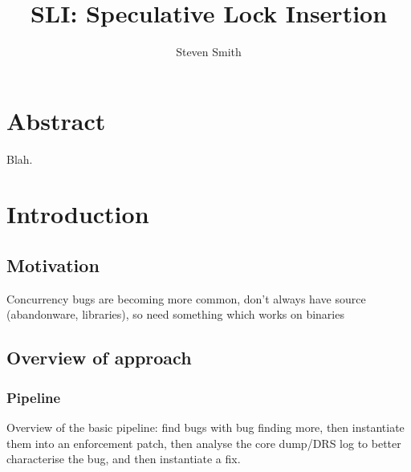 \documentclass[12pt,a4paper]{book}
\author{Steven Smith}
\title{SLI: Speculative Lock Insertion}
\begin{document}
\newcommand{\editorial}[1]{\textcolor{red}{\footnote{\textcolor{red}{#1}}}}
\newcommand{\needCite}{\editorial{need cite}}
\newcommand{\todo}[1]{\textcolor{red}{#1}}
\newcommand{\StateMachine}{finite state automaton}
\newcommand{\StateMachines}{finite state automata}
\newcommand{\CrashSummary}{crash summary}
\newcommand{\CrashSummaries}{crash summaries}
\newcommand{\concatDynTraces}{\oplus}
\newcommand{\queue}[1]{\{#1\}}
\newcommand{\map}[1]{\{#1\}}
\newcommand{\mapIndex}[2]{#1[#2]}
\newcommand{\state}[1]{#1}

\maketitle

\chapter{Abstract}
Blah.

\chapter{Introduction}
\section{Motivation}
Concurrency bugs are becoming more common, don't always have source (abandonware, libraries), so need something which works on binaries

\section{Overview of approach}
\subsection{Pipeline}
Overview of the basic pipeline: find bugs with bug finding more, then instantiate them into an enforcement patch, then analyse the core dump/DRS log to better characterise the bug, and then instantiate a fix.
\end{document}
